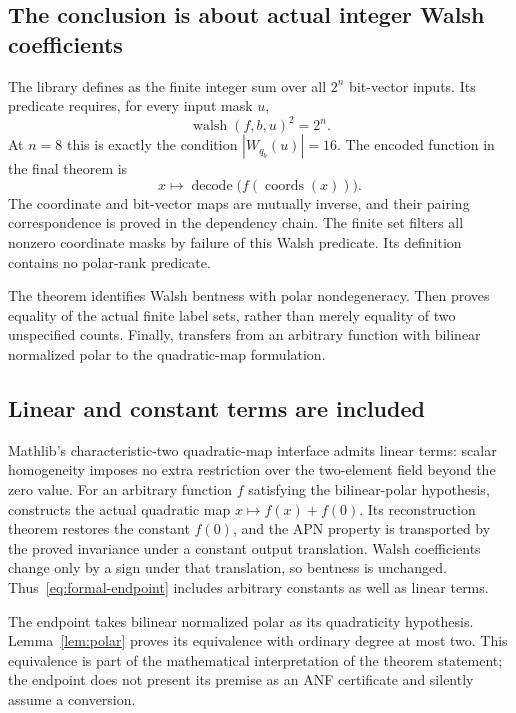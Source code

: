 \subsection{The conclusion is about actual integer Walsh coefficients}
The library  defines  as the finite integer sum over all $2^n$ bit-vector inputs. Its predicate  requires, for every input mask $u$,
\[
\operatorname{walsh}(f,b,u)^2=2^n.
\]
At $n=8$ this is exactly the condition $|W_{q_b}(u)|=16$. The encoded function in the final theorem is
\[
x\longmapsto\operatorname{decode}\bigl(f(\operatorname{coords}(x))\bigr).
\]
The coordinate and bit-vector maps are mutually inverse, and their pairing correspondence is proved in the dependency chain. The finite set  filters all nonzero coordinate masks by failure of this Walsh predicate. Its definition contains no polar-rank predicate.

The theorem  identifies Walsh bentness with polar nondegeneracy. Then  proves equality of the actual finite label sets, rather than merely equality of two unspecified counts. Finally,  transfers from an arbitrary function with bilinear normalized polar to the quadratic-map formulation.

\subsection{Linear and constant terms are included}
Mathlib's characteristic-two quadratic-map interface admits linear terms: scalar homogeneity imposes no extra restriction over the two-element field beyond the zero value. For an arbitrary function $f$ satisfying the bilinear-polar hypothesis,  constructs the actual quadratic map $x\mapsto f(x)+f(0)$. Its reconstruction theorem restores the constant $f(0)$, and the APN property is transported by the proved invariance under a constant output translation. Walsh coefficients change only by a sign under that translation, so bentness is unchanged. Thus~\eqref{eq:formal-endpoint} includes arbitrary constants as well as linear terms.

The endpoint takes bilinear normalized polar as its quadraticity hypothesis. Lemma~\ref{lem:polar} proves its equivalence with ordinary degree at most two. This equivalence is part of the mathematical interpretation of the theorem statement; the endpoint does not present its premise as an ANF certificate and silently assume a conversion.

